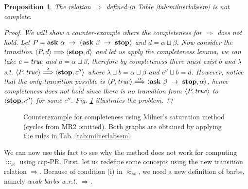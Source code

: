 \documentclass[copyright,creativecommons]{eptcs}
\newcommand{\askp}[2]{\ask \  #1 \  \rightarrow \ #2}
\newcommand{\true}{{\it true}}
\newcommand{\ask}{{\bf ask}}
\newcommand{\Stop}{{\bf stop}}
\newcommand{\pairccp}[2]{\langle #1,#2 \rangle}
\newcommand{\stopp}{\mbox{\Stop}}
\newcommand{\wsatbis}{\dot{\approx}_{sb}}
\newtheorem{proposition}{Proposition}
\newcommand{\newtrans}[1]{\stackrel{#1}{\Longrightarrow}}
\newcommand{\A}{\alpha}
\newcommand{\B}{\beta}
\newcommand{\C}{\lambda}
\newcommand{\conf}[2]{\pairccp{#1}{#2}}
\newcommand{\newtransition}[5]{\conf{#1}{#2} \newtrans{#3} \conf{#4}{#5}}
\newcommand{\lub}{\sqcup}
\begin{document}
\begin{proposition}
\label{prop:milnerComp}
The relation $\newtrans{}$ defined in Table \ref{tab:milnerlabsem} is not complete.
\begin{proof}
We will show a counter-example where the completeness for $\newtrans{}$ does not hold.
Let $P=\askp{\A}{(\askp{\B}{\Stop})}$ and $d = \A \lub \B$. Now consider the transition
$\newtransition{P}{d}{}{\stopp}{d}$ and let us apply the
completeness lemma, we can take $c = \true$ and $a = \A \lub \B$, therefore
by completeness there must exist $b$ and $\C$ s.t. $\newtransition{P}{\true}{\C}{\stopp}{c''}$
where $\C \lub b = \A \lub \B$ and $c'' \lub b = d$. However, notice that the only transition
possible is $\newtransition{P}{\true}{\A}{\askp{\B}{\Stop}}{\A}$, hence completeness
does not hold since there is no transition from $\conf{P}{\true}$ to $\conf{\stopp}{c''}$ for some $c''$.
Fig. \ref{fig:milnerCompleteness} illustrates the problem.
\end{proof}
\end{proposition}

\begin{figure}
\caption{Counterexample for completeness using Milner's saturation method (cycles from MR2 omitted).
Both graphs are obtained by applying the rules in Tab. \ref{tab:milnerlabsem}.}
\label{fig:milnerCompleteness}
\end{figure}

We can now use this fact to see why the method does not work
for computing $\wsatbis$ using ccp-PR. First, let us redefine some
concepts using the new transition relation $\newtrans{}$. Because of condition
(i) in $\wsatbis$, we need a new definition of barbs,
namely \emph{weak barbs w.r.t. $\newtrans{}$}.
\end{document}
